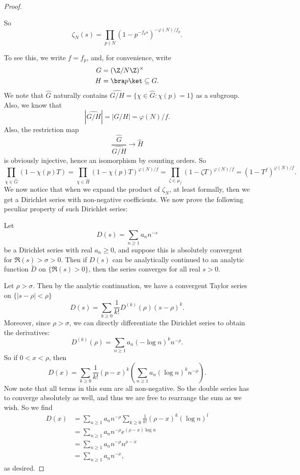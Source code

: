 \documentclass[a4paper]{article}
\begin{document}
\begin{proof}
\begin{claim}
    So
    \[
      \zeta_N(s) = \prod_{p \nmid N} (1 - p^{-f_p s})^{-\varphi(N)/f_p}.
    \]
  \end{claim}
  To see this, we write $f = f_p$, and, for convenience, write
  \begin{align*}
    G &= (\Z/N\Z)^\times\\
    H &= \bra p \ket \subseteq G.
  \end{align*}
  We note that $\hat{G}$ naturally contains $\widehat{G/H} = \{\chi \in \hat{G}: \chi(p) = 1\}$ as a subgroup. Also, we know that
  \[
    |\widehat{G/H}| = |G/H| = \varphi(N)/f.
  \]
  Also, the restriction map
  \[
    \frac{\hat{G}}{\widehat{G/H}} \to \hat{H}
  \]
  is obviously injective, hence an isomorphism by counting orders. So
  \[
    \prod_{\chi \in \hat{G}} (1 - \chi(p) T) = \prod_{\chi \in \hat{H}}(1 - \chi(p) T)^{\varphi(N)/f} = \prod_{\zeta \in \mu_f}(1 - \zeta T)^{\varphi(N)/f} = (1 - T^f)^{\varphi(N)/f}.
  \]
  We now notice that when we expand the product of $\zeta_N$, at least formally, then we get a Dirichlet series with non-negative coefficients. We now prove the following peculiar property of such Dirichlet series:
  \begin{claim}
    Let
    \[
      D(s) = \sum_{n \geq 1} a_n n^{-s}
    \]
    be a Dirichlet series with real $a_n \geq 0$, and suppose this is absolutely convergent for $\Re(s) > \sigma > 0$. Then if $D(s)$ can be analytically continued to an analytic function $\tilde{D}$ on $\{\Re(s) > 0\}$, then the series converges for all real $s > 0$.
  \end{claim}
  Let $\rho > \sigma$. Then by the analytic continuation, we have a convergent Taylor series on $\{|s - \rho| < \rho\}$
  \[
    D(s) = \sum_{k \geq 0} \frac{1}{k!} D^{(k)}(\rho) (s - \rho)^k.
  \]
  Moreover, since $\rho > \sigma$, we can directly differentiate the Dirichlet series to obtain the derivatives:
  \[
    D^{(k)} (\rho) = \sum_{n\geq 1} a_n (-\log n)^k n^{-\rho}.
  \]
  So if $0 < x < \rho$, then
  \[
    D(x) = \sum_{k \geq 0} \frac{1}{k!} (p - x)^k \left(\sum_{n \geq 1} a_n (\log n)^k n^{-\rho}\right).
  \]
  Now note that all terms in this sum are all non-negative. So the double series has to converge absolutely as well, and thus we are free to rearrange the sum as we wish. So we find
  \begin{align*}
    D(x) &= \sum_{n \geq 1} a_n n^{-\rho} \sum_{k \geq 0} \frac{1}{k!} (\rho - x)^k (\log n)^l\\
    &= \sum_{n \geq 1} a_n n^{-\rho} e^{(\rho - x) \log n}\\
    &= \sum_{n \geq 1} a_n n^{-\rho} n^{\rho - x}\\
    &= \sum_{n \geq 1} a_n n^{-x},
  \end{align*}
  as desired.


\end{proof}
\end{document}
